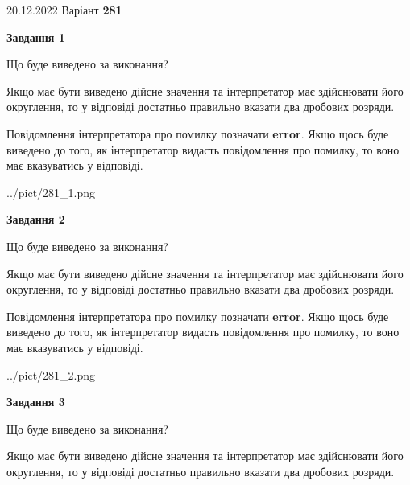 \documentclass[12pt, ukrainian]{article}
\begin{document}
{20.12.2022 Варіант \No \textbf { 281 }\par}
{
\begin {Large}

{\begin {center}\textbf{Завдання 1}\end {center}}\par
Що буде виведено за виконання? \par

Якщо має бути виведено дійсне значення та інтерпретатор має здійснювати його округлення, 
то у відповіді достатньо правильно вказати два дробових розряди.

Повідомлення інтерпретатора про помилку позначати \textbf{error}.
Якщо щось буде виведено до того, як інтерпретатор видасть повідомлення про помилку, 
то воно має вказуватись у відповіді. \par

\begin{center}
	{../pict/281_1.png}
\end{center}
\newpage

{\begin {center}\textbf{Завдання 2}\end {center}}\par
Що буде виведено за виконання? \par

Якщо має бути виведено дійсне значення та інтерпретатор має здійснювати його округлення, 
то у відповіді достатньо правильно вказати два дробових розряди.

Повідомлення інтерпретатора про помилку позначати \textbf{error}.
Якщо щось буде виведено до того, як інтерпретатор видасть повідомлення про помилку, 
то воно має вказуватись у відповіді. \par

\begin{center}
	{../pict/281_2.png}
\end{center}
\newpage

{\begin {center}\textbf{Завдання 3}\end {center}}\par
Що буде виведено за виконання? \par

Якщо має бути виведено дійсне значення та інтерпретатор має здійснювати його округлення, 
то у відповіді достатньо правильно вказати два дробових розряди.


\end{Large}}
\end{document}
